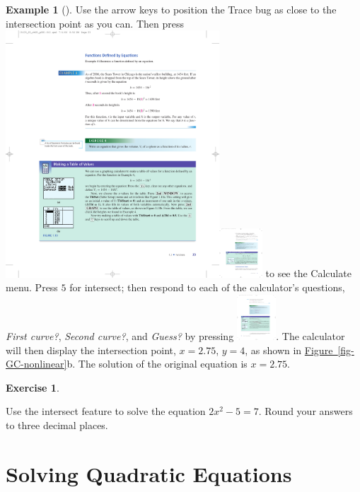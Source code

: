 \documentclass[10pt,]{book}
\theoremstyle{plain}
\theoremstyle{definition}
\theoremstyle{definition}
\newtheorem{example}[theorem]{Example}
\theoremstyle{definition}
\newtheorem{exercise}[theorem]{Exercise}
\begin{document}
\begin{example}[]
    Use the arrow keys to position the Trace bug as close to the intersection point as you can. Then press \includegraphics[width=0.6\textwidth,]{images/icon-2nd.pdf}\includegraphics[width=0.12\textwidth,]{images/icon-trace.pdf} to see the Calculate menu. Press \(5\) for intersect; then respond to each of the calculator's questions, \emph{First curve?}, \emph{Second curve?}, and \emph{Guess?} by pressing \includegraphics[width=0.11\textwidth,]{images/icon-enter.pdf}. The calculator will then display the intersection point, \(x = 2.75\), \(y = 4\), as shown in \hyperref[fig-GC-nonlinear]{Figure~\ref{fig-GC-nonlinear}}b. The solution of the original equation is \(x = 2.75\).
\end{example}
\begin{exercise}\label{exercise-GC-nonlinear}

    Use the intersect feature to solve the equation \(2x^2 − 5 = 7\). Round your answers to three decimal places.
\end{exercise}
\typeout{************************************************}
\typeout{************************************************}
\section[Solving Quadratic Equations]{Solving Quadratic Equations}\label{Solving-Quadratic-Equations}
\end{document}
